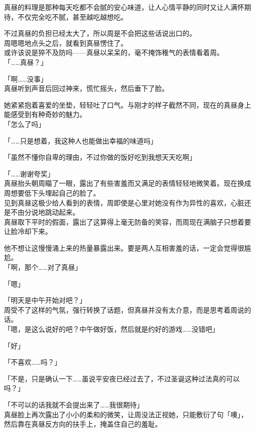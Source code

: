 真昼的料理是那种每天吃都不会腻的安心味道，让人心情平静的同时又让人满怀期待，不仅完全吃不腻，甚至越吃越想吃。

不过真昼的负担已经太大了，所以周是不会把这些话说出口的。\\

周嗯嗯地点头之后，就看到真昼愣住了。\\

或许该说是猝不及防吗——真昼以呆呆的，毫不掩饰稚气的表情看着周。\\

「……真昼？」

「啊……没事」\\

真昼听到声音后回过神来，慌忙摇头，然后垂下了脸。

她紧紧抱着喜爱的坐垫，轻轻吐了口气。与刚才的样子截然不同，现在的真昼身上能感受到有种奇妙的魅力。\\

「怎么了吗」

「……只是想着，我这种人也能做出幸福的味道吗」

「虽然不懂你自卑的理由，不过你做的饭好吃到我想天天吃啊」

「……谢谢夸奖」\\

真昼抬头朝周瞄了一眼，露出了有些害羞而又满足的表情轻轻地微笑着。现在换成周想要低下头埋起自己的脸了。\\

见到真昼这极少给人看到的表情，周即使是心里对她没有作为异性的喜欢，心脏还是不由分说地跳动起来。\\

真昼取下平时的假面，露出了这算得上毫无防备的笑容，而周现在满脑子只想着要让脸冷却下来。

他不想让这慢慢涌上来的热量暴露出来。要是两人互相害羞的话，一定会觉得很尴尬。\\

「啊，那个……对了真昼」

「嗯」

「明天是中午开始对吧？」\\

周受不了这样的气氛，强行转换了话题，但真昼并没有太介意，而是思考着周说的话。\\

「嗯，是这么说好的吧？中午做好饭，然后就是约好的游戏……没错吧」

「好」

「不喜欢……吗？」

「不是，只是确认一下……虽说平安夜已经过去了，不过圣诞这种过法真的可以吗？」

「不可以的话我就不会提出来了……我很期待」\\

真昼脸上再次露出了小小的柔和的微笑，让周没法正视她，只能敷衍了句「噢」，然后靠在真昼反方向的扶手上，掩盖住自己的羞耻。
